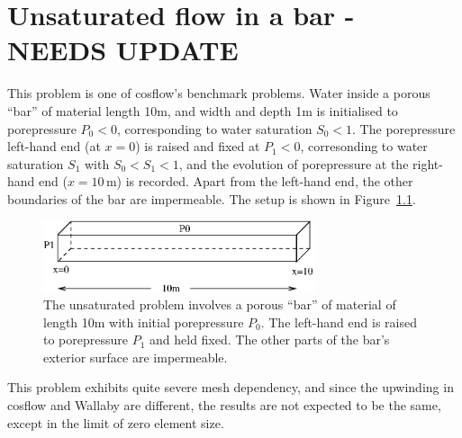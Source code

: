 \documentclass[]{scrreprt}
\begin{document}
\chapter{Unsaturated flow in a bar - NEEDS UPDATE}

This problem is one of cosflow's benchmark problems.  Water inside a
porous ``bar'' of material length 10m, and width and depth 1m is
initialised to porepressure $P_{0}<0$, corresponding to water
saturation $S_{0}<1$.  The porepressure left-hand end (at $x=0$) is
raised and fixed at $P_{1}<0$, corresonding to water saturation
$S_{1}$ with $S_{0}<S_{1}<1$, and the evolution of porepressure at the
right-hand end ($x=10$\,m) is recorded.  Apart from the left-hand end,
the other boundaries of the bar are impermeable.  The setup is shown in
Figure~\ref{uf_setup.fig}.

\begin{figure}[htb]
\begin{center}
\includegraphics[width=8cm]{uf_setup.eps}
\caption{The unsaturated problem involves a porous
  ``bar'' of material of length 10m with initial porepressure
  $P_{0}$.  The left-hand end is raised to porepressure $P_{1}$ and
  held fixed.  The other parts of the bar's exterior surface are impermeable.}
\label{uf_setup.fig}
\end{center}
\end{figure}

This problem exhibits quite severe mesh dependency, and since the
upwinding in cosflow and Wallaby are different, the results are not
expected to be the same, except in the limit of zero element size.
\end{document}
